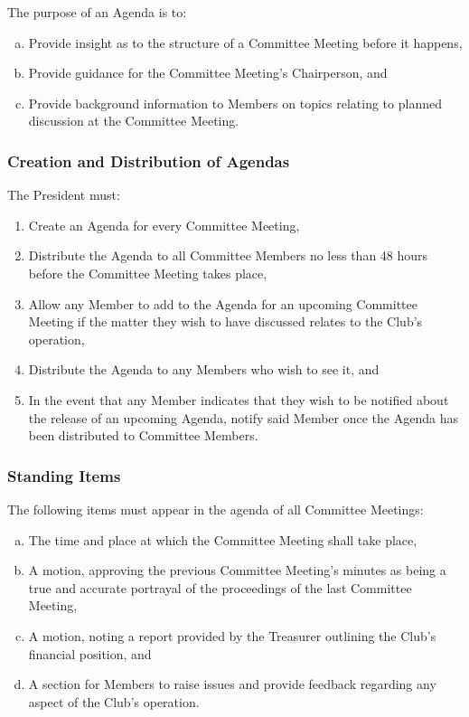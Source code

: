 \documentclass[a4paper,12pt]{article}
\begin{document}
The purpose of an Agenda is to:

\begin{enumerate}[a)]
	\item Provide insight as to the structure of a Committee Meeting before it happens,
	\item Provide guidance for the Committee Meeting's Chairperson, and
	\item Provide background information to Members on topics relating to planned discussion at the Committee Meeting.
\end{enumerate}

\subsubsection{Creation and Distribution of Agendas}

The President must:

\begin{enumerate}
	\item Create an Agenda for every Committee Meeting,
	\item Distribute the Agenda to all Committee Members no less than 48 hours before the Committee Meeting takes place,
	\item Allow any Member to add to the Agenda for an upcoming Committee Meeting if the matter they wish to have discussed relates to the Club's operation,
	\item Distribute the Agenda to any Members who wish to see it, and
	\item In the event that any Member indicates that they wish to be notified about the release of an upcoming Agenda, notify said Member once the Agenda has been distributed to Committee Members.
\end{enumerate}

\subsubsection{Standing Items}

The following items must appear in the agenda of all Committee Meetings:

\begin{enumerate}[a)]
	\item The time and place at which the Committee Meeting shall take place,
	\item A motion, approving the previous Committee Meeting's minutes as being a true and accurate portrayal of the proceedings of the last Committee Meeting,
	\item A motion, noting a report provided by the Treasurer outlining the Club's financial position, and
	\item A section for Members to raise issues and provide feedback regarding any aspect of the Club's operation.
\end{enumerate}
\end{document}
